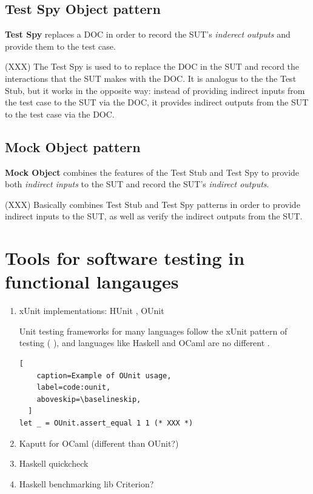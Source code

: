 
\subsection{Test Spy Object pattern}
\label{testdoubles:spy}

\textbf{Test Spy} replaces a DOC in order to record the SUT's
\textit{inderect outputs} and provide them to the test case.

(XXX) The Test Spy is used to to replace the DOC in the SUT and record
the interactions that the SUT makes with the DOC. It is analogus to
the the Test Stub, but it works in the opposite way: instead of
providing indirect inputs from the test case to the SUT via the DOC,
it provides indirect outputs from the SUT to the test case via the
DOC.

\subsection{Mock Object pattern}
\label{testdoubles:mocks}

\textbf{Mock Object} combines the features of the Test Stub and Test
Spy to provide both \textit{indirect inputs} to the SUT and record the
SUT's \textit{indirect outputs}.

(XXX) Basically combines Test Stub and Test Spy patterns in order to
provide indirect inputs to the SUT, as well as verify the indirect
outputs from the SUT.

\section{Tools for software testing in functional langauges}
\label{testtools}

\begin{enumerate}
\item xUnit implementations: HUnit \cite{www:hunit}, OUnit \cite{www:ounit}

Unit testing frameworks for many languages follow the xUnit pattern of
testing (\cite{www:junit} \cite{www:nunit} \cite{www:ruby:unit}), and
languages like Haskell and OCaml are no different \cite{www:hunit}
\cite{www:ounit}.

\begin{lstlisting}[
    caption=Example of OUnit usage,
    label=code:ounit,
    aboveskip=\baselineskip,
  ]
let _ = OUnit.assert_equal 1 1 (* XXX *)
\end{lstlisting}

\item Kaputt for OCaml \cite{www:kaputt} (different than OUnit?)

\item Haskell quickcheck \cite{claessen:quickcheck}

\item Haskell benchmarking lib Criterion? \cite{www:criterion}

\end{enumerate}
